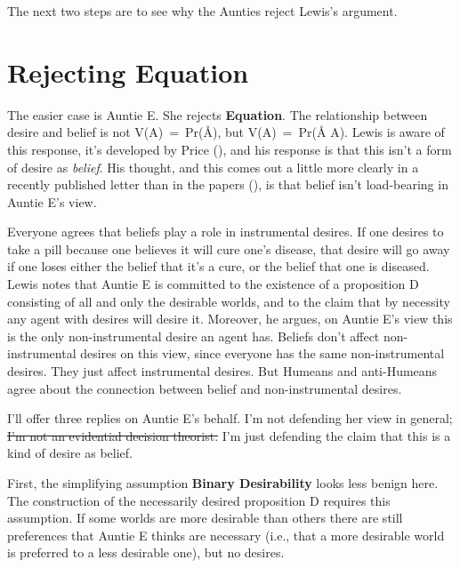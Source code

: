 \documentclass[
  11pt,
  letterpaper,
  DIV=11,
  numbers=noendperiod,
  twoside]{scrartcl}
\begin{document}
\endgroup

The next two steps are to see why the Aunties reject Lewis's argument.

\section{Rejecting Equation}\label{sec-auntie-e}

The easier case is Auntie E. She rejects \textbf{Equation}. The
relationship between desire and belief is not V(A)~=~Pr(Å), but
V(A)~=~Pr(Å \textbar{} A). Lewis is aware of this response, it's
developed by Price (), and his response is
that this isn't a form of desire as \emph{belief}. His thought, and this
comes out a little more clearly in a recently published letter than in
the papers (), is that belief isn't load-bearing in Auntie E's view.

Everyone agrees that beliefs play a role in instrumental desires. If one
desires to take a pill because one believes it will cure one's disease,
that desire will go away if one loses either the belief that it's a
cure, or the belief that one is diseased. Lewis notes that Auntie E is
committed to the existence of a proposition D consisting of all and only
the desirable worlds, and to the claim that by necessity any agent with
desires will desire it. Moreover, he argues, on Auntie E's view this is
the only non-instrumental desire an agent has. Beliefs don't affect
non-instrumental desires on this view, since everyone has the same
non-instrumental desires. They just affect instrumental desires. But
Humeans and anti-Humeans agree about the connection between belief and
non-instrumental desires.

I'll offer three replies on Auntie E's behalf. I'm not defending her
view in general; \sout{I'm not an evidential decision theorist.} I'm
just defending the claim that this is a kind of desire as belief.

First, the simplifying assumption \textbf{Binary Desirability} looks
less benign here. The construction of the necessarily desired
proposition D requires this assumption. If some worlds are more
desirable than others there are still preferences that Auntie E thinks
are necessary (i.e., that a more desirable world is preferred to a less
desirable one), but no desires.
\end{document}

